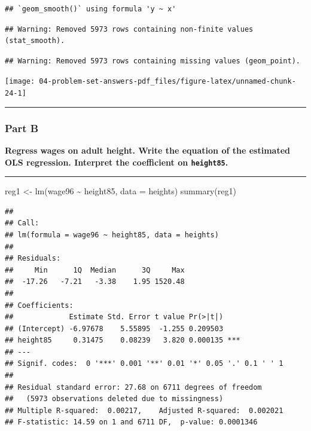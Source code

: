 \documentclass[
]{article}
\newenvironment{Shaded}{\begin{snugshade}}{\end{snugshade}}
\newcommand{\AttributeTok}[1]{\textcolor[rgb]{0.77,0.63,0.00}{#1}}
\newcommand{\FunctionTok}[1]{\textcolor[rgb]{0.00,0.00,0.00}{#1}}
\newcommand{\NormalTok}[1]{#1}
\newcommand{\OtherTok}[1]{\textcolor[rgb]{0.56,0.35,0.01}{#1}}
\newcommand{\SpecialCharTok}[1]{\textcolor[rgb]{0.00,0.00,0.00}{#1}}
\begin{document}
\begin{verbatim}
## `geom_smooth()` using formula 'y ~ x'
\end{verbatim}

\begin{verbatim}
## Warning: Removed 5973 rows containing non-finite values (stat_smooth).
\end{verbatim}

\begin{verbatim}
## Warning: Removed 5973 rows containing missing values (geom_point).
\end{verbatim}

\texttt{[image: 04-problem-set-answers-pdf\_files/figure-latex/unnamed-chunk-24-1]}

\begin{center}\rule{0.5\linewidth}{0.5pt}\end{center}

\hypertarget{part-b-4}{%
\subsubsection{Part B}\label{part-b-4}}

\textbf{Regress wages on adult height. Write the equation of the
estimated OLS regression. Interpret the coefficient on
\texttt{height85}.}

\begin{center}\rule{0.5\linewidth}{0.5pt}\end{center}

\begin{Shaded}
\begin{Highlighting}[]
\NormalTok{reg1 }\OtherTok{\textless{}{-}} \FunctionTok{lm}\NormalTok{(wage96 }\SpecialCharTok{\textasciitilde{}}\NormalTok{ height85, }\AttributeTok{data =}\NormalTok{ heights)}
\FunctionTok{summary}\NormalTok{(reg1)}
\end{Highlighting}
\end{Shaded}

\begin{verbatim}
## 
## Call:
## lm(formula = wage96 ~ height85, data = heights)
## 
## Residuals:
##     Min      1Q  Median      3Q     Max 
##  -17.26   -7.21   -3.38    1.95 1520.48 
## 
## Coefficients:
##             Estimate Std. Error t value Pr(>|t|)    
## (Intercept) -6.97678    5.55895  -1.255 0.209503    
## height85     0.31475    0.08239   3.820 0.000135 ***
## ---
## Signif. codes:  0 '***' 0.001 '**' 0.01 '*' 0.05 '.' 0.1 ' ' 1
## 
## Residual standard error: 27.68 on 6711 degrees of freedom
##   (5973 observations deleted due to missingness)
## Multiple R-squared:  0.00217,    Adjusted R-squared:  0.002021 
## F-statistic: 14.59 on 1 and 6711 DF,  p-value: 0.0001346
\end{verbatim}
\end{document}
